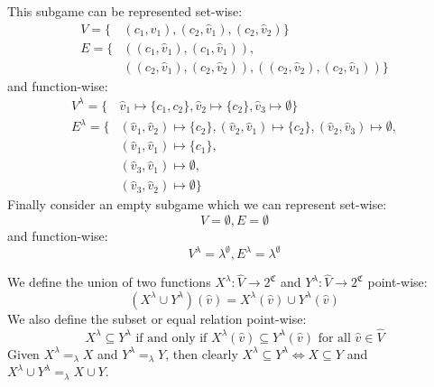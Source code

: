 \begin{example}
\begin{center}
	\end{center}
	This subgame can be represented set-wise:
	\begin{align*}
	V = \{&(c_1,\hat{v}_1),(c_2,\hat{v}_1),(c_2,\hat{v}_2) \}\\
	E = \{& ((c_1,\hat{v}_1),(c_1,\hat{v}_1)), \\
	&((c_2,\hat{v}_1),(c_2,\hat{v}_2)),((c_2,\hat{v}_2),(c_2,\hat{v}_1)) \}
	\end{align*}
	and function-wise:
	\begin{align*}
	V^\lambda = \{&\hat{v}_1 \mapsto \{c_1,c_2\},\hat{v}_2 \mapsto \{c_2\},\hat{v}_3 \mapsto \emptyset\}\\
	E^\lambda = \{&(\hat{v}_1,\hat{v}_2) \mapsto \{c_2\},(\hat{v}_2,\hat{v}_1) \mapsto \{c_2\},(\hat{v}_2,\hat{v}_3) \mapsto \emptyset,\\
	&(\hat{v}_1,\hat{v}_1) \mapsto \{c_1\},\\
	&(\hat{v}_3,\hat{v}_1) \mapsto \emptyset,\\
	&(\hat{v}_3,\hat{v}_2) \mapsto \emptyset\}
	\end{align*}
	Finally consider an empty subgame which we can represent set-wise:
	\[ V = \emptyset, E = \emptyset \]
	and function-wise:
	\[ V^\lambda = \lambda^\emptyset, E^\lambda = \lambda^\emptyset \]
\end{example}

We define the union of two functions $X^\lambda : \hat{V} \rightarrow 2^\mathfrak{C}$ and $Y^\lambda : \hat{V} \rightarrow 2^\mathfrak{C}$ point-wise:
\[ (X^\lambda \cup Y^\lambda)(\hat{v}) = X^\lambda(\hat{v}) \cup Y^\lambda(\hat{v})\]
We also define the subset or equal relation point-wise:
\[ X^\lambda \subseteq Y^\lambda\text{ if and only if } X^\lambda(\hat{v}) \subseteq Y^\lambda(\hat{v})\text{ for all }\hat{v} \in \hat{V} \]
Given $X^\lambda =_\lambda X$ and $Y^\lambda =_\lambda Y$, then clearly $X^\lambda \subseteq Y^\lambda \iff X \subseteq Y$ and $X^\lambda \cup Y^\lambda =_\lambda X \cup Y$.

